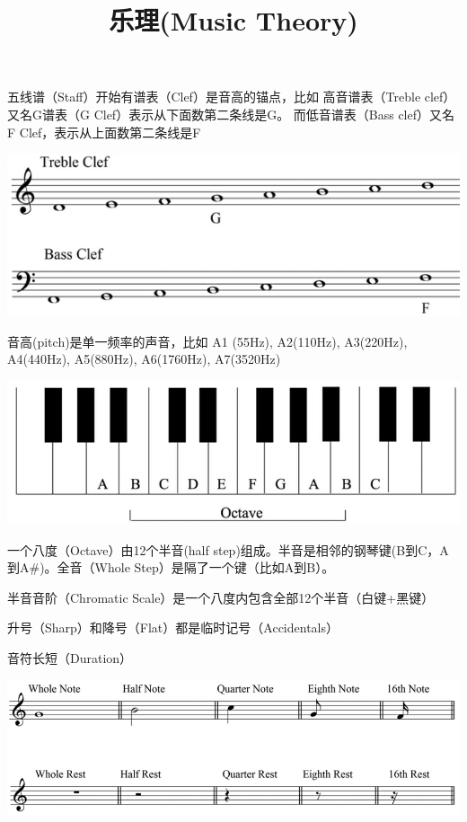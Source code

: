 \documentclass[UTF8]{ctexart}
\title{乐理(Music Theory)}
\begin{document}
	\maketitle
	

五线谱（Staff）开始有谱表（Clef）是音高的锚点，比如
高音谱表（Treble clef）又名G谱表（G Clef）表示从下面数第二条线是G。
而低音谱表（Bass clef）又名F Clef，表示从上面数第二条线是F
\begin{center}
	\includegraphics[scale=0.5]{clef.png}
\end{center}


音高(pitch)是单一频率的声音，比如
A1 (55Hz), A2(110Hz), A3(220Hz), A4(440Hz), A5(880Hz), A6(1760Hz), A7(3520Hz)
\begin{center}
	\includegraphics[scale=0.5]{piano_octave.png}
\end{center}
一个八度（Octave）由12个半音(half step)组成。半音是相邻的钢琴键(B到C，A到A\#)。全音（Whole Step）是隔了一个键（比如A到B）。

半音音阶（Chromatic Scale）是一个八度内包含全部12个半音（白键+黑键）

升号（Sharp）和降号（Flat）都是临时记号（Accidentals）

音符长短（Duration）
\begin{center}
	\includegraphics[scale=0.5]{duration.png}
\end{center}
\end{document}
